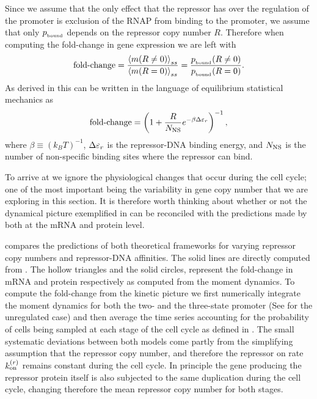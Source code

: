 Since we assume that the only effect that the repressor has over the regulation
of the promoter is exclusion of the RNAP from binding to the promoter, we assume
that only $p_{_\text{bound}}$ depends on the repressor copy number $R$. Therefore when
computing the fold-change in gene expression we  are left with
\begin{equation}
  \text{fold-change} = {\left\langle m (R \neq 0) \right\rangle_{ss} \over \left\langle m (R = 0) \right\rangle_{ss}}
              = {p_{_\text{bound}} (R \neq 0) \over p_{_\text{bound}} (R = 0)}.
\end{equation}
As derived in \cite{Garcia2011c} this can be written in the language of
equilibrium statistical mechanics as
\begin{equation}
  \text{fold-change} = \left(1 + {R \over N_\text{NS}}e^{-\beta \Delta\varepsilon_r}  \right)^{-1},
  \label{seq_fold_change_thermo}
\end{equation}
where $\beta \equiv (k_BT)^{-1}$, $\Delta\varepsilon_r$ is the repressor-DNA binding energy, and
$N_\text{NS}$ is the number of non-specific binding sites where the repressor can bind.

To arrive at  we ignore the physiological changes
that occur during the cell cycle; one of the most important being the
variability in gene copy number that we are exploring in this section. It is
therefore worth thinking about whether or not the dynamical picture exemplified
in  can be reconciled with the predictions made by
 both at the mRNA and protein level.

 compares the predictions of both theoretical
frameworks for varying repressor copy numbers and repressor-DNA affinities. The
solid lines are directly computed from . The hollow
triangles and the solid circles, represent the fold-change in mRNA and protein
respectively as computed from the moment dynamics. To compute the fold-change
from the kinetic picture we first numerically integrate the moment dynamics for
both the two- and the three-state promoter (See  for
the unregulated case) and then average the time series accounting for the
probability of cells being sampled at each stage of the cell cycle as defined in
. The small systematic deviations between both models come
partly from the simplifying assumption that the repressor copy number, and
therefore the repressor on rate $k^{(r)}_{\text{on}}$ remains constant during the cell cycle.
In principle the gene producing the repressor protein itself is also subjected
to the same duplication during the cell cycle, changing therefore the mean
repressor copy number for both stages.

